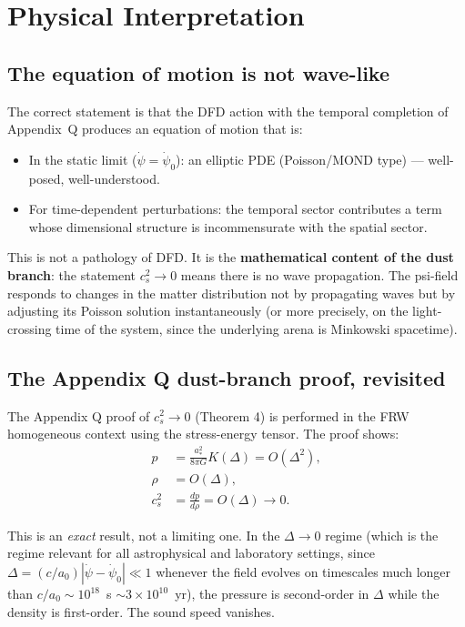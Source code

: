 \documentclass[11pt]{article}
\newcommand{\ee}[1]{\times 10^{#1}}
\begin{document}
\section{Physical Interpretation}

\subsection{The equation of motion is not wave-like}

The correct statement is that the DFD action with the temporal completion of Appendix~Q produces an equation of motion that is:
\begin{itemize}[nosep]
\item In the static limit ($\dot\psi = \dot\psi_0$): an elliptic PDE (Poisson/MOND type) --- well-posed, well-understood.
\item For time-dependent perturbations: the temporal sector contributes a term whose dimensional structure is incommensurate with the spatial sector.
\end{itemize}

This is not a pathology of DFD. It is the \textbf{mathematical content of the dust branch}: the statement $c_s^2 \to 0$ means there is no wave propagation. The psi-field responds to changes in the matter distribution not by propagating waves but by adjusting its Poisson solution instantaneously (or more precisely, on the light-crossing time of the system, since the underlying arena is Minkowski spacetime).

\subsection{The Appendix Q dust-branch proof, revisited}

The Appendix Q proof of $c_s^2 \to 0$ (Theorem 4) is performed in the FRW homogeneous context using the stress-energy tensor. The proof shows:
\begin{align}
p &= \frac{a_*^2}{8\pi G}K(\Delta) = O(\Delta^2), \\
\rho &= O(\Delta), \\
c_s^2 &= \frac{dp}{d\rho} = O(\Delta) \to 0.
\end{align}

This is an \emph{exact} result, not a limiting one. In the $\Delta \to 0$ regime (which is the regime relevant for all astrophysical and laboratory settings, since $\Delta = (c/a_0)|\dot\psi - \dot\psi_0| \ll 1$ whenever the field evolves on timescales much longer than $c/a_0 \sim 10^{18}$~s $\sim 3\ee{10}$~yr), the pressure is second-order in $\Delta$ while the density is first-order. The sound speed vanishes.
\end{document}
